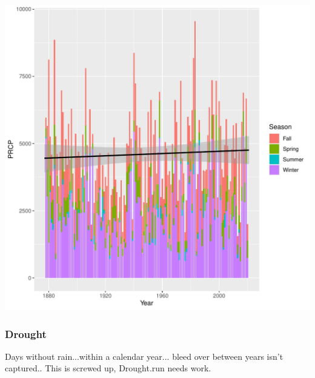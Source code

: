 \documentclass{article}
\begin{document}
\begin{knitrout}
\color{fgcolor}\begin{kframe}


{\ttfamily\noindent\itshape{}}\end{kframe}
\includegraphics[width=\maxwidth]{figure/unnamed-chunk-10-1} 
\end{knitrout}

\subsubsection{Drought}

Days without rain...within a calendar year... bleed over between years isn't captured.. This is screwed up, Drought.run needs work.
\end{document}
